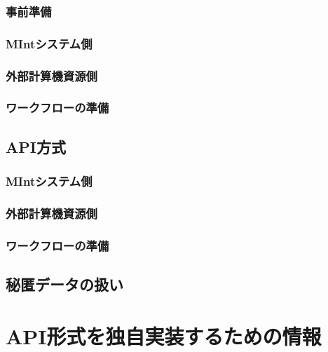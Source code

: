 \documentclass[letterpaper,10pt,dvipdfmx,openany]{sphinxmanual}
\begin{document}
\subsection{事前準備}
\label{\detokenize{using_distributed_properties:id27}}

\subsection{MIntシステム側}
\label{\detokenize{using_distributed_properties:id28}}

\subsection{外部計算機資源側}
\label{\detokenize{using_distributed_properties:id29}}

\subsection{ワークフローの準備}
\label{\detokenize{using_distributed_properties:id30}}

\section{API方式}
\label{\detokenize{using_distributed_properties:id31}}

\subsection{MIntシステム側}
\label{\detokenize{using_distributed_properties:id32}}

\subsection{外部計算機資源側}
\label{\detokenize{using_distributed_properties:id33}}

\subsection{ワークフローの準備}
\label{\detokenize{using_distributed_properties:id34}}

\section{秘匿データの扱い}
\label{\detokenize{using_distributed_properties:id35}}

\chapter{API形式を独自実装するための情報}
\label{\detokenize{using_distributed_properties:id36}}
\end{document}
